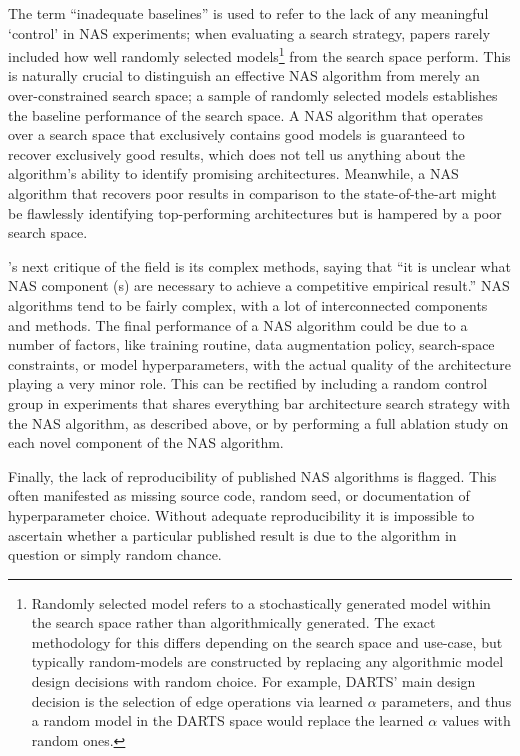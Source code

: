 The term ``inadequate baselines'' is used to refer to the lack of any meaningful `control' in NAS experiments;
when evaluating a search strategy, papers rarely included how well randomly selected models\footnote{Randomly
selected model refers to a stochastically generated model within the search space rather than algorithmically generated.
The exact methodology for this differs depending on the search space and use-case, but
typically random-models are constructed by replacing any algorithmic model design decisions with
random choice. For example, DARTS' main design decision is the selection of edge operations via learned $\alpha$ parameters, and thus a random model
in the DARTS space would replace the learned $\alpha$ values with random ones.} from the search
space perform. This is naturally crucial to distinguish an effective NAS algorithm from merely an over-constrained
search space; a sample of randomly selected models establishes the baseline performance of the search space. A NAS
algorithm that operates over a search space that exclusively contains good models is guaranteed to recover exclusively
good results, which does not tell us anything about the algorithm's ability to identify promising architectures.
Meanwhile, a NAS algorithm that recovers poor results in comparison to the state-of-the-art might be
flawlessly identifying top-performing architectures but is hampered by a poor search space.

\citeauthor{li2019}'s next critique of the field is its complex methods, saying that ``it is unclear what NAS component
(s) are necessary to achieve a competitive empirical result.''\citep[p. 2]{li2019} NAS algorithms tend to be fairly complex, with a lot of
interconnected components and methods. The final performance of a NAS algorithm could be due to a number of factors,
like training routine, data augmentation policy, search-space constraints, or model hyperparameters, with the actual
quality of the architecture playing a very minor role. This can be rectified by including a random control group in
experiments that shares everything bar architecture search strategy with the NAS algorithm, as described above, or by
performing a full ablation study on each novel component of the NAS algorithm.

Finally, the lack of reproducibility of published NAS algorithms is flagged. This often manifested as missing source
code, random seed, or documentation of hyperparameter choice. Without adequate reproducibility it is impossible to
ascertain whether a particular published result is due to the algorithm in question or simply random chance.

